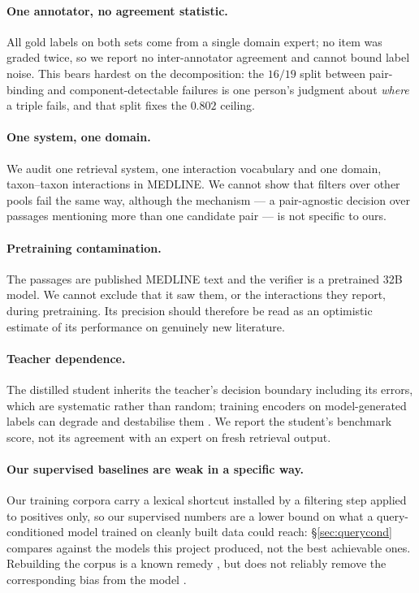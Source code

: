 \documentclass[11pt]{article}
\begin{document}
\paragraph{One annotator, no agreement statistic.} All gold labels on both sets come from a
single domain expert; no item was graded twice, so we report no inter-annotator agreement and
cannot bound label noise. This bears hardest on the decomposition: the $16/19$ split between
pair-binding and component-detectable failures is one person's judgment about \emph{where} a
triple fails, and that split fixes the $0.802$ ceiling.

\paragraph{One system, one domain.} We audit one retrieval system, one interaction vocabulary
and one domain, taxon--taxon interactions in MEDLINE. We cannot show that filters over other pools fail the same way,
although the mechanism --- a pair-agnostic decision over passages mentioning more than one
candidate pair --- is not specific to ours.

\paragraph{Pretraining contamination.} The passages are published MEDLINE text and the verifier
is a pretrained 32B model. We cannot exclude that it saw them, or the interactions they report,
during pretraining. Its precision should therefore be read as an optimistic estimate of its
performance on genuinely new literature.

\paragraph{Teacher dependence.} The distilled student inherits the teacher's decision boundary
including its errors, which are systematic rather than random; training encoders on
model-generated labels can degrade and destabilise them \citep{lu2025feeding}. We report the
student's benchmark score, not its agreement with an expert on fresh retrieval output.

\paragraph{Our supervised baselines are weak in a specific way.} Our training corpora carry a
lexical shortcut installed by a filtering step applied to positives only, so our supervised
numbers are a lower bound on what a query-conditioned model trained on cleanly built data could
reach: \S\ref{sec:querycond} compares against the models this project produced, not the best
achievable ones. Rebuilding the corpus is a known remedy \citep{lebras-etal-2020-adversarial},
but does not reliably remove the corresponding bias from the model
\citep{serrano-etal-2023-stubborn}.



\end{document}
